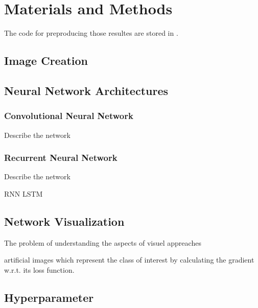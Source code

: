 \section{Materials and Methods}
\label{sec:materials_and_methods}



The code for preproducing those resultes are stored in \cite{github}.


\subsection{Image Creation}
\subsection{Neural Network Architectures}

\subsubsection{Convolutional Neural Network}

Describe the network

\subsubsection{Recurrent Neural Network}

Describe the network

RNN LSTM

\subsection{Network Visualization}

The problem of understanding the aspects of visuel appreaches


artificial images which represent the class of interest by calculating the gradient w.r.t. its loss function. 

\subsection{Hyperparameter}

